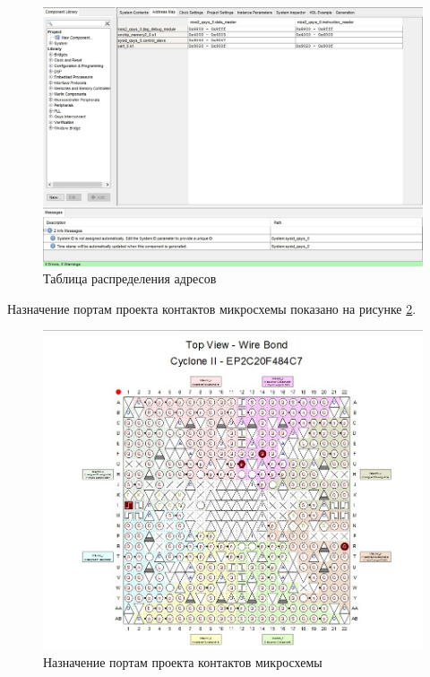 \begin{figure}[H]
	\begin{center}
		\includegraphics[scale=0.45]{img/map.jpg}
	\end{center}
	\captionsetup{justification=centering}
	\caption{Таблица распределения адресов}
	\label{img:map}
\end{figure}

Назначение портам проекта контактов микросхемы показано на рисунке \ref{img:planner}.

\begin{figure}[H]
	\begin{center}
		\includegraphics[scale=0.45]{img/planner.jpeg}
	\end{center}
	\captionsetup{justification=centering}
	\caption{Назначение портам проекта контактов микросхемы}
	\label{img:planner}
\end{figure}

